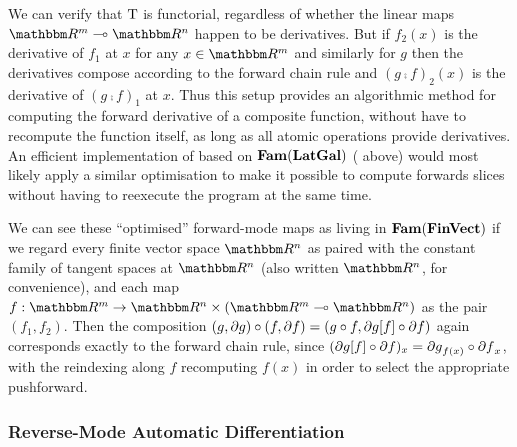 We can verify that $\mathrm{T}$ is functorial, regardless of whether the linear maps $\RR^m \linearto \RR^n$
happen to be derivatives. But if $f_2(x)$ is the derivative of $f_1$ at $x$ for any $x \in \RR^m$ and
similarly for $g$ then the derivatives compose according to the forward chain rule and $(g \comp f)_2(x)$ is
the derivative of $(g \comp f)_1$ at $x$. Thus this setup provides an algorithmic method for computing the
forward derivative of a composite function, without have to recompute the function itself, as long as all
atomic operations provide derivatives. An efficient implementation of \GPS based on $\mathbf{Fam}(\mathbf{LatGal})$
( above) would most likely apply a similar optimisation to make it possible to
compute forwards slices without having to reexecute the program at the same time.

We can see these ``optimised'' forward-mode maps as living in $\mathbf{Fam}(\mathbf{FinVect})$ if we regard every finite
vector space $\RR^n$ as paired with the constant family of tangent spaces at $\RR^n$ (also written $\RR^n$,
for convenience), and each map $f: \RR^m \to \RR^n \times (\RR^m \linearto \RR^n)$ as the pair $(f_1, f_2)$.
Then the composition $(g, \partial g) \circ (f, \partial f) = (g \circ f, \partial g[f] \circ
\partial f)$ again corresponds exactly to the forward chain rule, since $(\partial g[f] \circ
\partial f)_x = {\partial g}_{f(x)} \circ {\partial f}_x$, with the reindexing along $f$ recomputing $f(x)$ in
order to select the appropriate pushforward.

\subsubsection{Reverse-Mode Automatic Differentiation}

